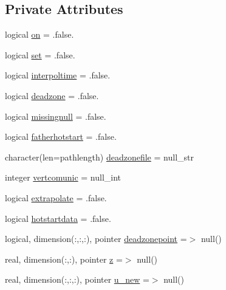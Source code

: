 \subsection*{Private Attributes}
\begin{DoxyCompactItemize}
\item 
logical \mbox{\hyperlink{structmodulehydrodynamic_1_1t__submodel_a952f6125ac1dd2c15379203edf67e660}{on}} = .false.
\item 
logical \mbox{\hyperlink{structmodulehydrodynamic_1_1t__submodel_a458796666e525e9ea75fe09e9333b96a}{set}} = .false.
\item 
logical \mbox{\hyperlink{structmodulehydrodynamic_1_1t__submodel_ad2c0488e83d0c5c36c0e19bf107d3514}{interpoltime}} = .false.
\item 
logical \mbox{\hyperlink{structmodulehydrodynamic_1_1t__submodel_a6ee37aef87737afd6e6532875d5c3f1f}{deadzone}} = .false.
\item 
logical \mbox{\hyperlink{structmodulehydrodynamic_1_1t__submodel_a7e926632d27b0969f58474c0e346e31c}{missingnull}} = .false.
\item 
logical \mbox{\hyperlink{structmodulehydrodynamic_1_1t__submodel_a234d21d50b57d272bd324f7f23a8d895}{fatherhotstart}} = .false.
\item 
character(len=pathlength) \mbox{\hyperlink{structmodulehydrodynamic_1_1t__submodel_aec1b9cacbe594ee965108364d8b9e31c}{deadzonefile}} = null\+\_\+str
\item 
integer \mbox{\hyperlink{structmodulehydrodynamic_1_1t__submodel_a8bc93addd059d283107696b3b87947ac}{vertcomunic}} = null\+\_\+int
\item 
logical \mbox{\hyperlink{structmodulehydrodynamic_1_1t__submodel_acf9632fd642cbc18c37168850d1e696a}{extrapolate}} = .false.
\item 
logical \mbox{\hyperlink{structmodulehydrodynamic_1_1t__submodel_af4314632b0dc7cd022a37d08214abb1f}{hotstartdata}} = .false.
\item 
logical, dimension(\+:,\+:,\+:), pointer \mbox{\hyperlink{structmodulehydrodynamic_1_1t__submodel_a3367b781d2521ea6281b45a7c30c9f78}{deadzonepoint}} =$>$ null()
\item 
real, dimension(\+:,\+:), pointer \mbox{\hyperlink{structmodulehydrodynamic_1_1t__submodel_a8795db774c23144d7a4fb7b7c7659782}{z}} =$>$ null()
\item 
real, dimension(\+:,\+:,\+:), pointer \mbox{\hyperlink{structmodulehydrodynamic_1_1t__submodel_a920f165c60dccc7fdcec5b939ba3dd94}{u\+\_\+new}} =$>$ null()
\item 

\end{DoxyCompactItemize}
